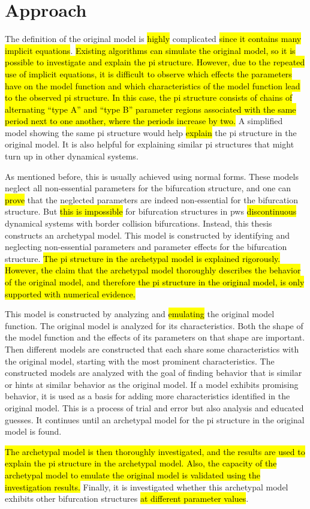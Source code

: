 \chapter{Approach}
\label{chap:approach}

The definition of the original model is \hl{highly} complicated \hl{since it contains many implicit equations}.
\hl{
	Existing algorithms can simulate the original model, so it is possible to investigate and explain the \gls{pi} structure.
	However, due to the repeated use of implicit equations, it is difficult to observe which effects the parameters have on the model function and which characteristics of the model function lead to the observed \gls{pi} structure.
	In this case, the \gls{pi} structure consists of chains of alternating ``type A'' and ``type B'' parameter regions associated with the same period next to one another, where the periods increase by two.
}
A simplified model showing the same \gls{pi} structure would help \hl{explain} the \gls{pi} structure in the original model.
It is also helpful for explaining similar \gls{pi} structures that might turn up in other dynamical systems.

As mentioned before, this is usually achieved using normal forms.
These models neglect all non-essential parameters for the bifurcation structure, and one can \hl{prove} that the neglected parameters are indeed non-essential for the bifurcation structure.
But \hl{this is impossible} for bifurcation structures in \gls{pws} \hl{discontinuous} dynamical systems with border collision bifurcations.
Instead, this thesis constructs an archetypal model.
This model is constructed by identifying and neglecting non-essential parameters and parameter effects for the bifurcation structure.
\hl{
	The \gls{pi} structure in the archetypal model is explained rigorously.
	However, the claim that the archetypal model thoroughly describes the behavior of the original model, and therefore the \gls{pi} structure in the original model, is only supported with numerical evidence.
}

This model is constructed by analyzing and \hl{emulating} the original model function.
The original model is analyzed for its characteristics.
Both the shape of the model function and the effects of its parameters on that shape are important.
Then different models are constructed that each share some characteristics with the original model, starting with the most prominent characteristics.
The constructed models are analyzed with the goal of finding behavior that is similar or hints at similar behavior as the original model.
If a model exhibits promising behavior, it is used as a basis for adding more characteristics identified in the original model.
This is a process of trial and error but also analysis and educated guesses.
It continues until an archetypal model for the \gls{pi} structure in the original model is found.


\hl{
	The archetypal model is then thoroughly investigated, and the results are used to explain the \gls{pi} structure in the archetypal model.
	Also, the capacity of the archetypal model to emulate the original model is validated using the investigation results.
}
Finally, it is investigated whether this archetypal model exhibits other bifurcation structures \hl{at different parameter values}.
